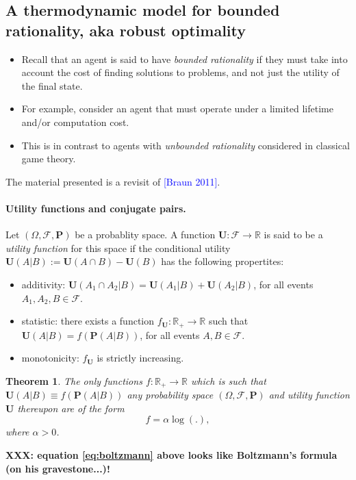 \documentclass{article} %
\newtheorem{theorem}{Theorem} \newtheorem{lemma}[theorem]{Lemma}
\def\U{\mathbf{U}}
\def\P{\mathbf{P}}
\begin{document}
\subsection{A thermodynamic model for bounded rationality, aka robust optimality}
\begin{itemize}
  \item Recall that an agent is said to have \textit{bounded rationality} if they must take into account the cost of finding solutions to problems, and not just the utility of the final state.
  \item For example, consider an agent that must operate under a limited lifetime and/or computation cost.
  \item This is in contrast to agents with \textit{unbounded rationality} considered in classical game theory.
    \end{itemize}
The material presented is a revisit of \textcolor{blue}{[Braun 2011]}.
\paragraph{Utility functions and conjugate pairs.}
  Let $(\Omega, \mathcal F, \P)$ be a probablity space. A function $\U: \mathcal F \rightarrow \mathbb R$ is said to be a \textit{utility function} for this space if the conditional utility $\U(A|B) := \U(A \cap B) - \U(B)$ has the following propertites:
  \begin{itemize}
  \item additivity: $\U(A_1 \cap A_2 | B) = \U(A_1|B) + \U(A_2|B)$, for all events $A_1, A_2, B \in \mathcal F$.    
  \item statistic: there exists a function $f_{\U} :\mathbb R_+ \rightarrow \mathbb R$ such that $\U(A|B) = f(\P(A|B))$, for all events
    $A,B \in \mathcal F$.
  \item monotonicity: $f_{\U}$ is strictly increasing.
    \end{itemize}

\begin{theorem}
  The only functions $f: \mathbb R_+ \rightarrow \mathbb R$ which is such that $\U(A|B) \equiv f(\P(A|B))$ any probability space $(\Omega, \mathcal F, \P)$ and utility function $\U$ thereupon are of the form
  \begin{equation}
    f = \alpha \log(.),
    \label{eq:boltzmann}
  \end{equation}
  where $\alpha > 0$.
\end{theorem}

\textbf{XXX: equation \eqref{eq:boltzmann} above looks like Boltzmann's formula (on his gravestone...)!}
\end{document}
